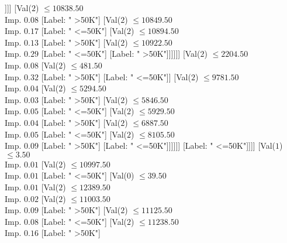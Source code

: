 \documentclass[margin=10pt]{standalone}
\begin{document}
\begin{forest}
															[Label: " <=50K"]
															[Val($2$) $ \leq 10804.50$ \\ Imp. $1.00$
																[Label: " >50K"]
																[Label: " <=50K"]]]]
													[Val($2$) $ \leq 10838.50$ \\ Imp. $0.08$
														[Label: " >50K"]
														[Val($2$) $ \leq 10849.50$ \\ Imp. $0.17$
															[Label: " <=50K"]
															[Val($2$) $ \leq 10894.50$ \\ Imp. $0.13$
																[Label: " >50K"]
																[Val($2$) $ \leq 10922.50$ \\ Imp. $0.29$
																	[Label: " <=50K"]
																	[Label: " >50K"]]]]]]
												[Val($2$) $ \leq 2204.50$ \\ Imp. $0.08$
													[Val($2$) $ \leq 481.50$ \\ Imp. $0.32$
														[Label: " >50K"]
														[Label: " <=50K"]]
													[Val($2$) $ \leq 9781.50$ \\ Imp. $0.04$
														[Val($2$) $ \leq 5294.50$ \\ Imp. $0.03$
															[Label: " >50K"]
															[Val($2$) $ \leq 5846.50$ \\ Imp. $0.05$
																[Label: " <=50K"]
																[Val($2$) $ \leq 5929.50$ \\ Imp. $0.04$
																	[Label: " >50K"]
																	[Val($2$) $ \leq 6887.50$ \\ Imp. $0.05$
																		[Label: " <=50K"]
																		[Val($2$) $ \leq 8105.50$ \\ Imp. $0.09$
																			[Label: " >50K"]
																			[Label: " <=50K"]]]]]]
														[Label: " <=50K"]]]]
											[Val($1$) $ \leq 3.50$ \\ Imp. $0.01$
												[Val($2$) $ \leq 10997.50$ \\ Imp. $0.01$
													[Label: " <=50K"]
													[Val($0$) $ \leq 39.50$ \\ Imp. $0.01$
														[Val($2$) $ \leq 12389.50$ \\ Imp. $0.02$
															[Val($2$) $ \leq 11003.50$ \\ Imp. $0.09$
																[Label: " >50K"]
																[Val($2$) $ \leq 11125.50$ \\ Imp. $0.08$
																	[Label: " <=50K"]
																	[Val($2$) $ \leq 11238.50$ \\ Imp. $0.16$
																		[Label: " >50K"]

\end{forest}
\end{document}

